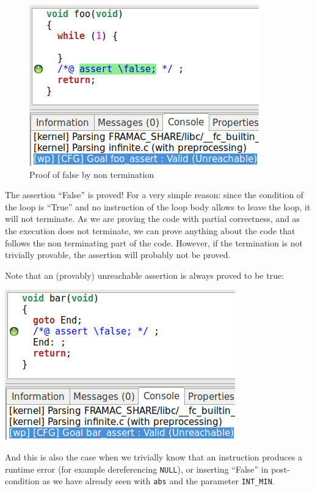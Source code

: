 \documentclass[12pt,francais,]{scrbook}
\newenvironment{zdsblock}[1]{%
  \tcolorbox[beamer,%
    noparskip,breakable,
    colback=LightBlue,colframe=DarkBlue,%
    colbacklower=DarkBlue,%
    title=#1]
}{\endtcolorbox}
\begin{document}
\begin{figure}[htbp]
  \centering
  \includegraphics[scale=0.5]{3-3-infinite.png}
  \caption{Proof of false by non termination}
  \label{fig:3-3-infini}
\end{figure}

The assertion ``False'' is proved! For a very simple reason: since the
condition of the loop is ``True'' and no instruction of the loop body
allows to leave the loop, it will not terminate. As we are proving the
code with partial correctness, and as the execution does not terminate,
we can prove anything about the code that follows the non terminating
part of the code. However, if the termination is not trivially provable,
the assertion will probably not be proved.

\begin{zdsblock}{Information}
  Note that an (provably) unreachable assertion is always proved to be true:
  \begin{center}
    \includegraphics[scale=0.5]{3-3-goto_end.png}
  \end{center}
  And this is also the case when we trivially know that an instruction
  produces a runtime error (for example dereferencing \texttt{NULL}), or
  inserting ``False'' in post-condition as we have already seen with
  \texttt{abs} and the parameter \texttt{INT\_MIN}.
\end{zdsblock}
\end{document}
